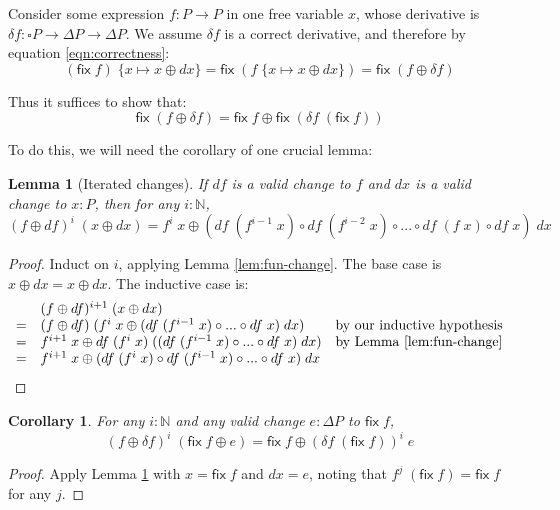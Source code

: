 \documentclass{article}
\newcommand{\ms}[1]{\ensuremath{\mathsf{#1}}}
\newcommand{\N}{\mathbb{N}}
\newcommand{\sub}[1]{\;\{{#1}\}}
\newcommand{\Disc}[1]{\square{#1}}
\newtheorem{corollary}{Corollary}
\newtheorem{lemma}{Lemma}
\theoremstyle{definition}
\newcommand{\fix}{\ms{fix}}
\newcommand{\dv}{\delta}
\begin{document}
Consider some expression $f : P \to P$ in one free variable $x$, whose
derivative is $\dv f : \Disc{P} \to \Delta P \to \Delta P$. We assume $\dv f$ is
a correct derivative, and therefore by equation \ref{eqn:correctness}:
\[
  (\fix\;f)\sub{x\mapsto x \oplus dx}
  = \fix\;(f\sub{x\mapsto x \oplus dx})
  = \fix\;(f \oplus \dv f)
\]

Thus it suffices to show that:
\[ \fix\;(f \oplus \dv f) = \fix\;f \oplus \fix\;(\dv f\; (\fix\;f)) \]

To do this, we will need the corollary of one crucial lemma:


\begin{lemma}[Iterated changes]
  \label{lem:crux} If $df$ is a valid change to $f$ and $dx$ is a valid change to $x : P$, then for any $i : \N$,
  \[
  (f\oplus df)^i \;(x \oplus dx)
  = f^i\;x \oplus
  (df\;(f^{i-1}\;x) \circ df\;(f^{i-2}\;x) \circ ...
  \circ df\;(f\;x) \circ df\;x)\; dx
  \]
\end{lemma}

\begin{proof}
  Induct on $i$, applying Lemma \ref{lem:fun-change}. The base case is $x \oplus
  dx = x \oplus dx$. The inductive case is:
  \[
  \begin{array}{cll}
     & (f \oplus df)^{i+1}\; (x \oplus dx)\\
    =& (f \oplus df)\; (f^i\;x \oplus
    (df \;(f^{i-1}\;x) \circ ... \circ df\;x)\;dx)
    & \text{by our inductive hypothesis}\\
    =& f^{i+1}\;x \oplus df\; (f^i\;x) \;
    ((df \;(f^{i-1}\;x) \circ ... \circ df\;x)\;dx)
    & \text{by Lemma \ref{lem:fun-change}}\\
    =& f^{i+1}\;x \oplus
    (df\;(f^i\;x) \circ df\;(f^{i-1}\;x) \circ ... \circ df\;x)\;dx
  \end{array}
  \]
\end{proof}

\begin{corollary}
  \label{cor:crux}
  For any $i : \N$ and any valid change $e : \Delta{P}$ to $\fix\;f$,
  \[
  (f\oplus\dv f)^i \;(\fix\;f \oplus e)
  = \fix\;f \oplus (\dv f \; (\fix\;f))^i \;e
  \]
\end{corollary}
\begin{proof}
  Apply Lemma \ref{lem:crux} with $x = \fix\;f$ and $dx = e$, noting that
  $f^j\;(\fix\;f) = \fix\;f$ for any $j$.
\end{proof}


\end{document}

